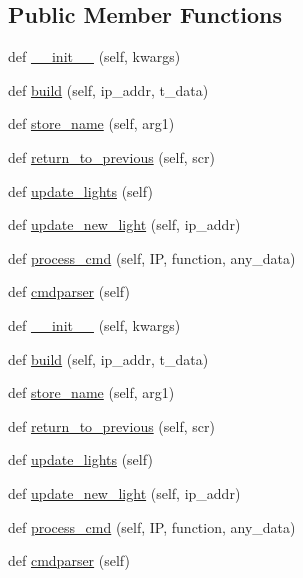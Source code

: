 \subsection*{Public Member Functions}
\begin{DoxyCompactItemize}
\item 
def \hyperlink{classGUI8_1_1Methods_aba86c23940691136e3da93a8b2e28c70}{\+\_\+\+\_\+init\+\_\+\+\_\+} (self, kwargs)
\item 
def \hyperlink{classGUI8_1_1Methods_a8dc5ac8766ebf6bcae0466c1dfd4e863}{build} (self, ip\+\_\+addr, t\+\_\+data)
\item 
def \hyperlink{classGUI8_1_1Methods_aee00254d2b626e58a413acaca6c7be85}{store\+\_\+name} (self, arg1)
\item 
def \hyperlink{classGUI8_1_1Methods_aa51f1baccfb563e106666bfdf1b5270b}{return\+\_\+to\+\_\+previous} (self, scr)
\item 
def \hyperlink{classGUI8_1_1Methods_a8ad14590b69daef6130be3f8973427d3}{update\+\_\+lights} (self)
\item 
def \hyperlink{classGUI8_1_1Methods_a76baa218c955655997f34f66dae66b40}{update\+\_\+new\+\_\+light} (self, ip\+\_\+addr)
\item 
def \hyperlink{classGUI8_1_1Methods_a46c377c8688fd2b08dc1fb5f1ea30106}{process\+\_\+cmd} (self, IP, function, any\+\_\+data)
\item 
def \hyperlink{classGUI8_1_1Methods_a5e130161d27497716d6f67fbe32f8795}{cmdparser} (self)
\item 
def \hyperlink{classGUI8_1_1Methods_aba86c23940691136e3da93a8b2e28c70}{\+\_\+\+\_\+init\+\_\+\+\_\+} (self, kwargs)
\item 
def \hyperlink{classGUI8_1_1Methods_a8dc5ac8766ebf6bcae0466c1dfd4e863}{build} (self, ip\+\_\+addr, t\+\_\+data)
\item 
def \hyperlink{classGUI8_1_1Methods_aee00254d2b626e58a413acaca6c7be85}{store\+\_\+name} (self, arg1)
\item 
def \hyperlink{classGUI8_1_1Methods_aa51f1baccfb563e106666bfdf1b5270b}{return\+\_\+to\+\_\+previous} (self, scr)
\item 
def \hyperlink{classGUI8_1_1Methods_a8ad14590b69daef6130be3f8973427d3}{update\+\_\+lights} (self)
\item 
def \hyperlink{classGUI8_1_1Methods_a76baa218c955655997f34f66dae66b40}{update\+\_\+new\+\_\+light} (self, ip\+\_\+addr)
\item 
def \hyperlink{classGUI8_1_1Methods_a46c377c8688fd2b08dc1fb5f1ea30106}{process\+\_\+cmd} (self, IP, function, any\+\_\+data)
\item 
def \hyperlink{classGUI8_1_1Methods_a5e130161d27497716d6f67fbe32f8795}{cmdparser} (self)
\end{DoxyCompactItemize}
